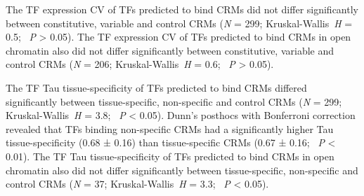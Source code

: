 \documentclass[../main.tex]{subfiles}
\begin{document}
The TF expression CV of TFs predicted to bind CRMs did not differ significantly between constitutive, variable and control CRMs (\textit{N} = 299; Kruskal\hyp{}Wallis~\textit{H} = 0.5; ~\textit{P} \textgreater{} 0.05).
The TF expression CV of TFs predicted to bind CRMs in open chromatin also did not differ significantly between constitutive, variable and control CRMs (\textit{N} = 206; Kruskal\hyp{}Wallis~\textit{H} = 0.6; ~\textit{P} \textgreater{} 0.05).

The TF Tau tissue\hyp{}specificity of TFs predicted to bind CRMs differed significantly between tissue\hyp{}specific, non\hyp{}specific and control CRMs (\textit{N} = 299; Kruskal\hyp{}Wallis~\textit{H} = 3.8; ~\textit{P} \textless{} 0.05).
Dunn's posthocs with Bonferroni correction revealed that TFs binding non\hyp{}specific CRMs had a significantly higher Tau tissue\hyp{}specificity (0.68 ± 0.16) than tissue\hyp{}specific CRMs (0.67 ± 0.16; ~\textit{P} \textless{} 0.01).
The TF Tau tissue\hyp{}specificity of TFs predicted to bind CRMs in open chromatin also did not differ significantly between tissue\hyp{}specific, non\hyp{}specific and control CRMs (\textit{N} = 37; Kruskal\hyp{}Wallis~\textit{H} = 3.3; ~\textit{P} \textless{} 0.05).








\end{document}
